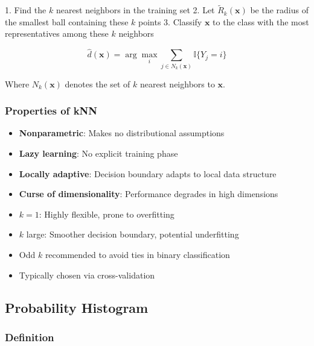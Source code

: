 \documentclass[12pt,a4paper]{article}
\begin{document}
1. Find the $k$ nearest neighbors in the training set
2. Let $\tilde{R}_k(\mathbf{x})$ be the radius of the smallest ball containing these $k$ points
3. Classify $\mathbf{x}$ to the class with the most representatives among these $k$ neighbors

\begin{equation}
\hat{d}(\mathbf{x}) = \arg\max_i \sum_{j \in N_k(\mathbf{x})} \mathbb{I}\{Y_j = i\}
\end{equation}

Where $N_k(\mathbf{x})$ denotes the set of $k$ nearest neighbors to $\mathbf{x}$.

\subsubsection{Properties of kNN}

\begin{itemize}
    \item \textbf{Nonparametric}: Makes no distributional assumptions
    \item \textbf{Lazy learning}: No explicit training phase
    \item \textbf{Locally adaptive}: Decision boundary adapts to local data structure
    \item \textbf{Curse of dimensionality}: Performance degrades in high dimensions
\end{itemize}

\begin{tcolorbox}[colback=yellow!5!white,colframe=orange!75!black,title=Choice of k]
\begin{itemize}
    \item $k = 1$: Highly flexible, prone to overfitting
    \item $k$ large: Smoother decision boundary, potential underfitting
    \item Odd $k$ recommended to avoid ties in binary classification
    \item Typically chosen via cross-validation
\end{itemize}
\end{tcolorbox}

\subsection{Probability Histogram}

\subsubsection{Definition}
\end{document}
